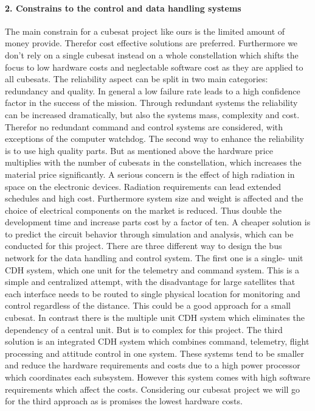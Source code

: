 \paragraph{2. Constrains to the control and data handling systems}
The main constrain for a cubesat project like ours is the limited amount of money provide. Therefor cost effective solutions are preferred. Furthermore we don’t rely on a single cubesat instead on a whole constellation which shifts the focus to low hardware costs and neglectable software cost as they are applied to all cubesats.
The reliability aspect can be split in two main categories: redundancy and quality. In general a low failure rate leads to a high confidence factor in the success of the mission. Through redundant systems the reliability can be increased dramatically, but also the systems mass, complexity and cost. Therefor no redundant command and control systems are considered, with exceptions of the computer watchdog. The second way to enhance the reliability is to use high quality parts. But as mentioned above the hardware price multiplies with the number of cubesats in the constellation, which increases the material price significantly.
 A serious concern is the effect of high radiation in space on the electronic devices. Radiation requirements can lead extended schedules and high cost. Furthermore system size and weight is affected and the choice of electrical components on the market is reduced. Thus double the development time and increase parts cost by a factor of ten. A cheaper solution is to predict the circuit behavior through simulation and analysis, which can be conducted for this project.
There are three different way to design the bus network for the data handling and control system. The first one is a single- unit CDH system, which one unit for the telemetry and command system. This is a simple and centralized attempt, with the disadvantage for large satellites that each interface needs to be routed to single physical location for monitoring and control regardless of the distance. This could be a good approach for a small cubesat. In contrast there is the multiple unit CDH system which eliminates the dependency of a central unit. But is to complex for this project. The third solution is an integrated CDH system which combines command, telemetry, flight processing and attitude control in one system. These systems tend to be smaller and reduce the hardware requirements and costs due to a high power processor which coordinates each subsystem. However this system comes with high software requirements which affect the costs. Considering our cubesat project we will go for the third approach as is promises the lowest hardware costs.

